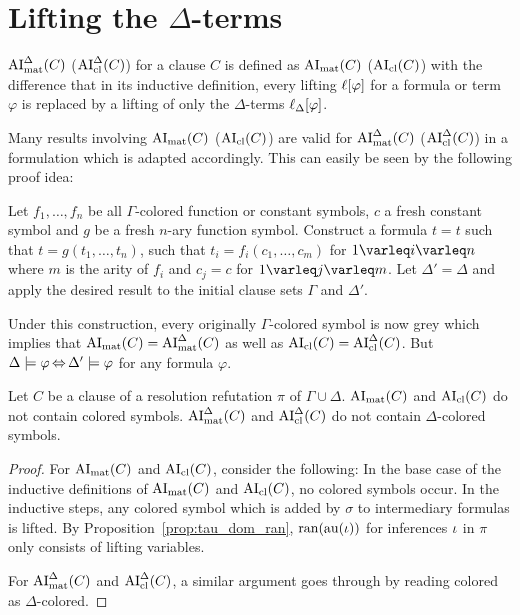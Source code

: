 \documentclass[,%
	draft=false,%
	numbers=noendperiod
	11pt,
	a4paper,
	oneside,%
	openany,
]{memoir}
\begin{document}
\section{Lifting the $\Delta$-terms}

\begin{defi}
	$\operatorname{AI}_\mathrm{mat}^\Delta(C)$ ($\operatorname{AI}_\mathrm{cl}^\Delta(C)$) for a clause $C$ is defined as $\operatorname{AI}_\mathrm{mat}(C)$ ($\operatorname{AI}_\mathrm{cl}(C)$) with the difference that in its inductive definition, every lifting $\ell[\varphi]$ for a formula or term $\varphi$ is replaced by a lifting of only the $\Delta$-terms $\ell_{\Delta}[\varphi]$.
\end{defi}

\begin{remark}
	Many results involving $\operatorname{AI}_\mathrm{mat}(C)$ ($\operatorname{AI}_\mathrm{cl}(C)$) are valid for $\operatorname{AI}_\mathrm{mat}^\Delta(C)$ ($\operatorname{AI}_\mathrm{cl}^\Delta(C)$) 
	in a formulation which is adapted accordingly.
	This can easily be seen by the following proof idea:

	Let $f_1, \dots, f_n$ be all $\Gamma$-colored function or constant symbols,
	$c$ a fresh constant symbol and $g$ be a fresh $n$-ary function symbol.
	Construct a formula $t = t$ such that $t = g(t_1, \dots, t_n)$,
	such that $t_i = f_i(c_1, \dots, c_m)$ for $1\varleq i \varleq n$ where $m$ is the arity of $f_i$ and $c_j = c$ for $1\varleq j \varleq m$. Let $\Delta' = \Delta$ and apply the desired result to the initial clause sets $\Gamma$ and $\Delta'$.

	Under this construction, every originally $\Gamma$-colored symbol is now grey which implies that $\operatorname{AI}_\mathrm{mat}(C) = \operatorname{AI}_\mathrm{mat}^\Delta(C)$ as well as $\operatorname{AI}_\mathrm{cl}(C) = \operatorname{AI}_\mathrm{cl}^\Delta(C)$.
	But $\Delta\models \varphi \operatorname{\Leftrightarrow} \Delta'\models \varphi$ for any formula $\varphi$.
\end{remark}

\begin{lemma}
	\label{lemma:no_colored_terms}
	Let $C$ be a clause of a resolution refutation $\pi$ of $\Gamma\cup\Delta$.
	$\operatorname{AI}_\mathrm{mat}(C)$ and $\operatorname{AI}_\mathrm{cl}(C)$ do not contain colored symbols.
	$\operatorname{AI}_\mathrm{mat}^\Delta(C)$ and $\operatorname{AI}_\mathrm{cl}^\Delta(C)$ do not contain \mbox{$\Delta$-c}olored symbols.
\end{lemma}
\begin{proof}
	For $\operatorname{AI}_\mathrm{mat}(C)$ and $\operatorname{AI}_\mathrm{cl}(C)$, consider the following:
	In the base case of the inductive definitions of $\operatorname{AI}_\mathrm{mat}(C)$ and $\operatorname{AI}_\mathrm{cl}(C)$, no colored symbols occur.
	In the inductive steps, any colored symbol which is added by $\sigma$ to intermediary formulas is lifted.
	By Proposition~\ref{prop:tau_dom_ran}, $\operatorname{ran}(\operatorname{au}(\iota))$ for inferences $\iota$ in $\pi$ only consists of lifting variables.

	For $\operatorname{AI}_\mathrm{mat}^\Delta(C)$ and $\operatorname{AI}_\mathrm{cl}^\Delta(C)$, a similar argument goes through by reading colored as $\Delta$-colored.
\end{proof}
\end{document}
